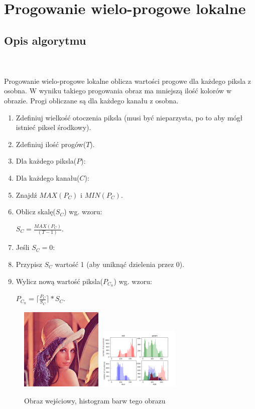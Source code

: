 \documentclass[final,a4paper,openany,12pt]{mwbk}
\begin{document}
\newpage




\section{Progowanie wielo-progowe lokalne}
\subsection*{Opis algorytmu}
\hfill
\\\\
\indent Progowanie wielo-progowe lokalne oblicza wartości progowe dla każdego piksla z osobna. W wyniku takiego progowania obraz ma mniejszą ilość kolorów w obrazie. Progi obliczane są dla każdego kanału z osobna.

\begin{enumerate}
	\item Zdefiniuj wielkość otoczenia piksla (musi być nieparzysta, po to aby mógł istnieć piksel środkowy).
	\item Zdefiniuj ilość progów($T$).
	\item Dla każdego piksla($P$):
	\item Dla każdego kanału($C$):
	\item Znajdź $MAX(P_C)$ i $MIN(P_C)$.
	\item Oblicz skalę($S_C$) wg. wzoru:\\
	\centerline{$S_C = \frac{MAX(P_C)}{(T - 1)}$.}
	\item Jeśli $S_C = 0$:
	\item Przypisz $S_C$ wartość 1 (aby uniknąć dzielenia przez 0).
	\item Wylicz nową wartość piksla($P_{C_{n}}$) wg. wzoru:\\
	\centerline{$P_{C_{n}} = \lceil \frac{P_C}{S_C} \rceil * S_C $.}
\end{enumerate}


\begin{figure}[H]
	\begin{center}
		\includegraphics[width=0.35\textwidth]{lena_color}
		\includegraphics[width=0.35\textwidth]{lena_color_histogram}
	\end{center}
	\caption{Obraz wejściowy, histogram barw tego obrazu}
\end{figure}
\end{document}
